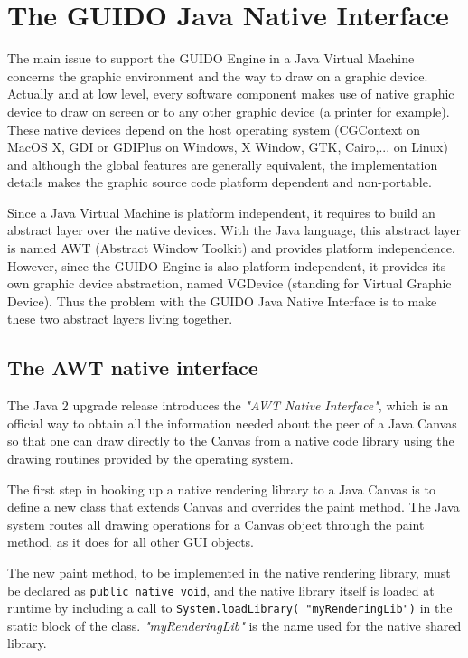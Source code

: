 \documentclass[a4paper]{article}
\newcommand{\code}[1]			{\texttt{#1}}
\begin{document}
\section{The GUIDO Java Native Interface}

The main issue to support the GUIDO Engine in a Java Virtual Machine concerns the graphic environment and the way to draw on a graphic device. Actually and at low level, every software component makes use of native graphic device to draw on screen or to any other graphic device (a printer for example). These native devices depend on the host operating system (CGContext on MacOS X, GDI or GDIPlus on Windows, X Window, GTK, Cairo,... on Linux) and although the global features are generally equivalent, the implementation details makes the graphic source code platform dependent and non-portable.

Since a Java Virtual Machine is platform independent, it requires to build an abstract layer over the native devices. With the Java language, this abstract layer is named AWT (Abstract Window Toolkit) and provides platform independence. However, since the GUIDO Engine is also platform independent, it provides its own graphic device abstraction, named  VGDevice (standing for Virtual Graphic Device). Thus the problem with the GUIDO Java Native Interface is to make these two abstract layers living together.

\subsection{The AWT native interface}

The Java 2 upgrade release introduces the \emph{"AWT Native Interface"}, which is an official way to obtain all the information needed about the peer of a Java Canvas so that one can draw directly to the Canvas from a native code library using the drawing routines provided by the operating system.

The first step in hooking up a native rendering library to a Java Canvas is to define a new class that extends Canvas and overrides the paint method. The Java system routes all drawing operations for a Canvas object through the paint method, as it does for all other GUI objects.

The new paint method, to be implemented in the native rendering library, must be declared as \code{public native void}, and the native library itself is loaded at runtime by including a call to \code{System.loadLibrary( "myRenderingLib")} in the static block of the class. \emph{"myRenderingLib"} is the name used for the native shared library.
\end{document}
